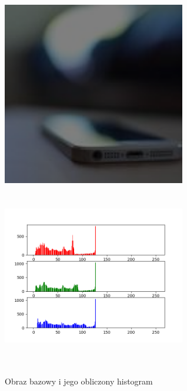 \documentclass[a4paper,12pt]{book}
\begin{document}
\begin{figure}[H]
	\caption{Obraz bazowy i jego obliczony histogram}
	\includegraphics[width=8cm, height=8cm]{phone-dark-unmodified.png}
	\includegraphics[width=8cm, height=8cm]{6-1/calculate-phone-dark.png}
	

\end{figure}
\end{document}
